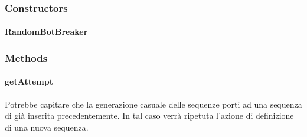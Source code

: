 \documentclass[letterpaper,10pt,italian,openany,oneside]{sphinxmanual}
\begin{document}
\subsubsection{Constructors}
\label{\detokenize{source/it/unicam/cs/pa/mastermind/players/RandomBotBreaker:constructors}}

\paragraph{RandomBotBreaker}
\label{\detokenize{source/it/unicam/cs/pa/mastermind/players/RandomBotBreaker:id1}}

\begin{fulllineitems}
\label{\detokenize{source/it/unicam/cs/pa/mastermind/players/RandomBotBreaker:it.unicam.cs.pa.mastermind.players.RandomBotBreaker.RandomBotBreaker(int)}}
\end{fulllineitems}



\subsubsection{Methods}
\label{\detokenize{source/it/unicam/cs/pa/mastermind/players/RandomBotBreaker:methods}}

\paragraph{getAttempt}
\label{\detokenize{source/it/unicam/cs/pa/mastermind/players/RandomBotBreaker:getattempt}}

\begin{fulllineitems}
\label{\detokenize{source/it/unicam/cs/pa/mastermind/players/RandomBotBreaker:it.unicam.cs.pa.mastermind.players.RandomBotBreaker.getAttempt()}}
Potrebbe capitare che la generazione casuale delle sequenze porti ad una sequenza di  già inserita precedentemente. In tal caso verrà ripetuta l’azione di definizione di una nuova sequenza.

\end{fulllineitems}
\end{document}
